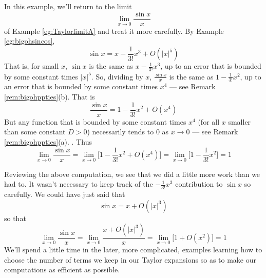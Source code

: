 \begin{eg}\label{eg:bigohlimitAA}
In this example, we'll return to the limit
\begin{equation*}
\lim_{x\rightarrow 0}\frac{\sin x}{x}
\end{equation*}
of Example \ref{eg:TaylorlimitA} and treat it more carefully.
By Example \ref{eg:bigohsincos},
\begin{equation*}
\sin x = x-\frac{1}{3!}x^3+O(|x|^5)
\end{equation*}
That is, for small $x$, $\sin x$ is the same as $x-\frac{1}{3!}x^3$,
up to an error that is bounded by some constant times $|x|^5$.
So, dividing by $x$, $\frac{\sin x}{x}$ is the same as
$1-\frac{1}{3!}x^2$, up to an error that is bounded by some
constant times $x^4$ --- see Remark \ref{rem:bigohppties}(b).
That is
\begin{equation*}
\frac{\sin x}{x}=1-\frac{1}{3!}x^2+O(x^4)
\end{equation*}
But any function that is bounded by some constant times $x^4$
(for all $x$ smaller than some constant $D>0$) necessarily tends to $0$
as $x\rightarrow 0$ --- see Remark \ref{rem:bigohppties}(a). . Thus
\begin{equation*}
\lim_{x\rightarrow 0}\frac{\sin x}{x}
=\lim_{x\rightarrow 0}\Big[1-\frac{1}{3!}x^2+O(x^4)\Big]
=\lim_{x\rightarrow 0}\Big[1-\frac{1}{3!}x^2\Big]
=1
\end{equation*}

Reviewing the above computation, we see that we did a little more work
than we had to. It wasn't necessary to keep track of the $-\frac{1}{3!}x^3$
contribution to $\sin x$ so carefully. We could have just said that
\begin{equation*}
\sin x = x+O(|x|^3)
\end{equation*}
so that
\begin{equation*}
\lim_{x\rightarrow 0}\frac{\sin x}{x}
=\lim_{x\rightarrow 0}\frac{x+O(|x|^3)}{x}
=\lim_{x\rightarrow 0}\big[1+O(x^2)\big]
=1
\end{equation*}
We'll spend a little time in the later, more complicated, examples
learning how to choose the number of terms we keep in our
Taylor expansions so as to make our computations as efficient as possible.
\end{eg}


